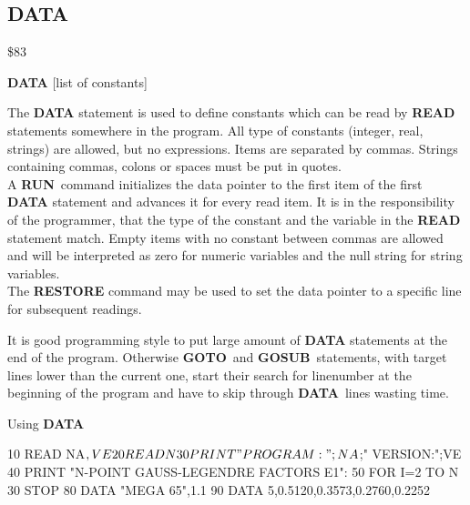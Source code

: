 \subsection{DATA}
\begin{description}[leftmargin=3cm,style=nextline]
\item [Token:] \$83
\item [Format:] {\bf DATA} [list of constants]
\item [Usage:] The {\bf DATA} statement is used to define constants
               which can be read by {\bf READ} statements somewhere
               in the program. All type of constants (integer, real,
               strings) are allowed, but no expressions.
               Items are separated by commas.
               Strings containing commas, colons or spaces must be put
               in quotes. \\
               A {\bf RUN} command initializes the data pointer
               to the first item of the first {\bf DATA} statement
               and advances it for every read item. It is in the
               responsibility of the programmer, that the type of
               the constant and the variable in the {\bf READ}
               statement match. Empty items with no constant
               between commas are allowed and will be interpreted as
               zero for numeric variables and the null string for
               string variables. \\
               The {\bf RESTORE} command may be used to set the
               data pointer to a specific line for subsequent
               readings.

\item [Remarks:] It is good programming style to put large amount of
               {\bf DATA} statements at the end of the program.
               Otherwise {\bf GOTO} and {\bf GOSUB} statements, with
               target lines lower than the current one,
               start their search for linenumber at the beginning of
               the program and have to skip through {\bf DATA} lines
               wasting time.
\item [Example:] Using {\bf DATA}
\begin{screenoutput}
10 READ NA$, VE
20 READ N%
30 PRINT "PROGRAM:";NA$;"   VERSION:";VE
40 PRINT "N-POINT GAUSS-LEGENDRE FACTORS E1":
50 FOR I=2 TO N%
30 STOP
80 DATA "MEGA 65",1.1
90 DATA 5,0.5120,0.3573,0.2760,0.2252
\end{screenoutput}
\end{description}

